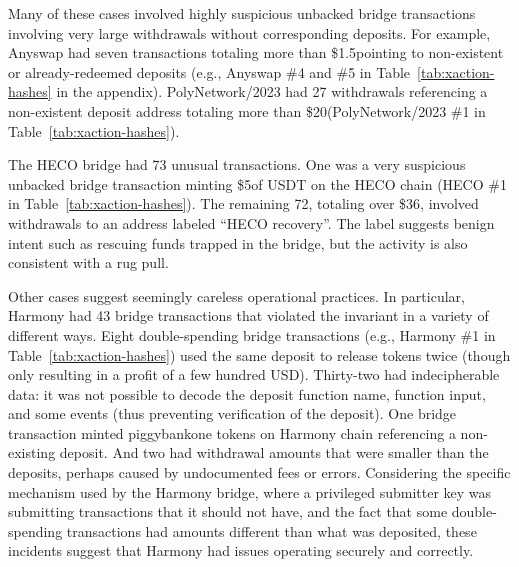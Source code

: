 
Many of these cases involved highly suspicious unbacked bridge
transactions involving very large withdrawals without corresponding
deposits.  For example, Anyswap had seven transactions totaling more than
\$1.5\mil pointing to non-existent or already-redeemed deposits (e.g., Anyswap \#4 and \#5 in
Table~\ref{tab:xaction-hashes} in the appendix).
%
PolyNetwork/2023 had 27 withdrawals referencing a non-existent
deposit address totaling more than \$20\mil (PolyNetwork/2023 \#1 in Table~\ref{tab:xaction-hashes}).

The HECO bridge had 73 unusual transactions.  One was a very
suspicious unbacked bridge transaction minting \$5\mil of USDT on the
HECO chain (HECO \#1 in Table~\ref{tab:xaction-hashes}).  The
remaining 72, totaling over \$36\mil, involved withdrawals to an
address labeled ``HECO recovery''.  The label suggests benign intent
such as rescuing funds trapped in the bridge, but the activity is also
consistent with a rug pull.


Other cases suggest seemingly careless operational practices.  In particular,
%
Harmony had 43 bridge transactions that violated the invariant in a
variety of different ways.
Eight double-spending bridge transactions (e.g., Harmony \#1 in Table~\ref{tab:xaction-hashes}) used the same deposit to
release tokens twice (though only resulting in a profit of a few
hundred USD).  
Thirty-two
had indecipherable data:
it was not possible to decode the deposit function name, function
input, and some events (thus preventing verification of the deposit).
One bridge transaction minted piggybankone tokens on Harmony
chain referencing a non-existing deposit.  And two
had withdrawal amounts that were smaller than the deposits, perhaps
caused by undocumented fees or errors.
%
Considering the specific mechanism used by the Harmony bridge, where a privileged submitter key
was submitting transactions that it should not have, 
and the fact that some double-spending transactions had amounts 
different than what was deposited,
these
incidents suggest that Harmony had issues operating securely and
correctly.




